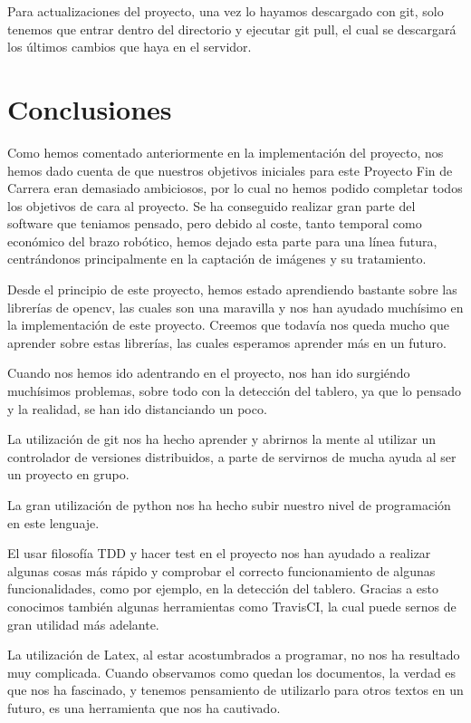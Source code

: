 \documentclass[12pt,a4paper]{report}
\begin{document}
Para actualizaciones del proyecto, una vez lo hayamos descargado con git, solo
tenemos que entrar dentro del directorio y ejecutar git pull, el cual se
descargará los últimos cambios que haya en el servidor. 


\chapter{Conclusiones}

Como hemos comentado anteriormente en la implementación del proyecto, nos hemos
dado cuenta de que nuestros objetivos iniciales para este Proyecto Fin de
Carrera eran demasiado ambiciosos, por lo cual no hemos podido completar todos
los objetivos de cara al proyecto. Se ha conseguido realizar gran parte del
software que teniamos pensado, pero debido al coste, tanto temporal como
económico del brazo robótico, hemos dejado esta parte para una línea futura,
centrándonos principalmente en la captación de imágenes y su tratamiento.

Desde el principio de este proyecto, hemos estado aprendiendo bastante sobre las
librerías de opencv, las cuales son una maravilla y nos han ayudado muchísimo en
la implementación de este proyecto. Creemos que todavía nos queda mucho que
aprender sobre estas librerías, las cuales esperamos aprender más en un futuro. 

Cuando nos hemos ido adentrando en el proyecto, nos han ido surgiéndo muchísimos
problemas, sobre todo con la detección del tablero, ya que lo pensado y la
realidad, se han ido distanciando un poco. 

La utilización de git nos ha hecho aprender y abrirnos la mente al utilizar un
controlador de versiones distribuidos, a parte de servirnos de mucha ayuda al
ser un proyecto en grupo. 

La gran utilización de python nos ha hecho subir nuestro nivel de programación
en este lenguaje.

El usar filosofía TDD y hacer test en el proyecto nos han ayudado a realizar
algunas cosas más rápido y comprobar el correcto funcionamiento de algunas
funcionalidades, como por ejemplo, en la detección del tablero. Gracias a esto
conocimos también algunas herramientas como TravisCI, la cual puede sernos de
gran utilidad más adelante. 

La utilización de Latex, al estar acostumbrados a programar, no nos ha resultado
muy complicada. Cuando observamos como quedan los documentos, la verdad es que
nos ha fascinado, y tenemos pensamiento de utilizarlo para otros textos en un
futuro, es una herramienta que nos ha cautivado.
\end{document}
